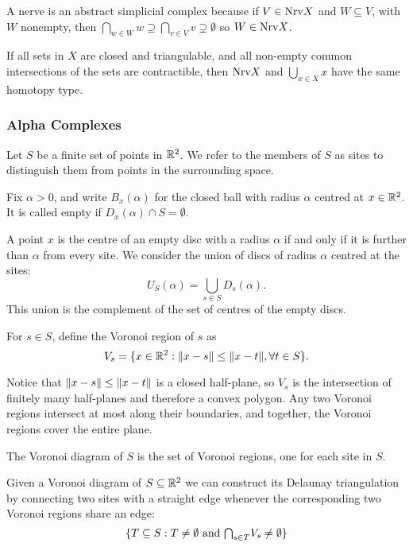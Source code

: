 A nerve is an abstract simplicial complex because if $V \in \textrm{Nrv} X$ and $W \subseteq V$, with $W$ nonempty, then $\bigcap_{w \in W} w \supseteq \bigcap_{v \in V} v \supsetneq \emptyset$ so $W \in \textrm{Nrv} X$.

\begin{theorem}
If all sets in $X$ are closed and triangulable, and all non-empty common intersections of the sets are contractible, then $\textrm{Nrv} X$ and $\bigcup_{x \in X} x$ have the same homotopy type.
\end{theorem}


\subsubsection{Alpha Complexes}

Let $S$ be a finite set of points in $\mathbb{R}^2$. We refer to the members of $S$ as sites to distinguish them from points in the surrounding space.

Fix $\alpha > 0$, and write $B_x(\alpha)$ for the closed ball with radius $\alpha$ centred at $x \in \mathbb{R}^2$. It is called empty if $D_x(\alpha) \cap S = \emptyset$.

A point $x$ is the centre of an empty disc with a radius $\alpha$ if and only if it is further than $\alpha$ from every site. We consider the union of discs of radius $\alpha$ centred at the sites:
$$
U_S(\alpha) = \bigcup_{s \in S} D_s(\alpha).
$$
This union is the complement of the set of centres of the empty discs.

\begin{definition}
For $s \in S$, define the Voronoi region of $s$ as
$$
V_s = \{x \in \mathbb{R}^2 : \lVert x-s\rVert \leq \lVert x-t\rVert, \forall t \in S\}.
$$
\end{definition}

Notice that $\lVert x - s\rVert \leq \lVert x - t\rVert$ is a closed half-plane, so $V_s$ is the intersection of finitely many half-planes and therefore a convex polygon. Any two Voronoi regions intersect at most along their boundaries, and together, the Voronoi regions cover the entire plane.

\begin{definition}
The Voronoi diagram of $S$ is the set of Voronoi regions, one for each site in $S$.
\end{definition}

\begin{definition}
Given a Voronoi diagram of $S \subseteq \mathbb{R}^2$ we can construct its Delaunay triangulation by connecting two sites with a straight edge whenever the corresponding two Voronoi regions share an edge:
$$
\{T \subseteq S: T \not= \emptyset \text{ and } \mathsmaller{\bigcap}_{s \in T} V_s \not = \emptyset\}
$$
\end{definition}

